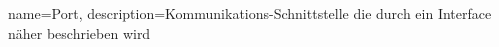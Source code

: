  {
   name=Port,
   description={Kommunikations-Schnittstelle die durch ein Interface näher beschrieben wird}
}


